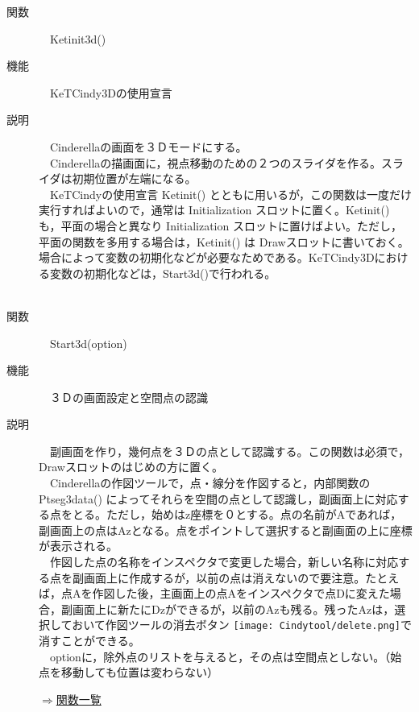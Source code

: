 \documentclass[papersize,a4paper,12pt,uplatex]{jsarticle}
\begin{document}
\begin{description}

\hypertarget{ketinit3d}{}
\item[関数]　Ketinit3d()
\item[機能]　KeTCindy3Dの使用宣言
\item[説明]　Cinderellaの画面を３Ｄモードにする。\\
　Cinderellaの描画面に，視点移動のための２つのスライダを作る。スライダは初期位置が左端になる。\\
　KeTCindyの使用宣言 Ketinit() とともに用いるが，この関数は一度だけ実行すればよいので，通常は Initialization スロットに置く。Ketinit() も，平面の場合と異なり Initialization スロットに置けばよい。ただし，平面の関数を多用する場合は，Ketinit() は Drawスロットに書いておく。場合によって変数の初期化などが必要なためである。KeTCindy3Dにおける変数の初期化などは，Start3d()で行われる。\\
　\\

\hypertarget{start3d}{}
\item[関数]　Start3d(option)
\item[機能]　３Ｄの画面設定と空間点の認識
\item[説明]　副画面を作り，幾何点を３Ｄの点として認識する。この関数は必須で，Drawスロットのはじめの方に置く。\\
　Cinderellaの作図ツールで，点・線分を作図すると，内部関数の Ptseg3data() によってそれらを空間の点として認識し，副画面上に対応する点をとる。ただし，始めはz座標を０とする。点の名前がAであれば，副画面上の点はAzとなる。点をポイントして選択すると副画面の上に座標が表示される。\\
　作図した点の名称をインスペクタで変更した場合，新しい名称に対応する点を副画面上に作成するが，以前の点は消えないので要注意。たとえば，点Aを作図した後，主画面上の点Aをインスペクタで点Dに変えた場合，副画面上に新たにDzができるが，以前のAzも残る。残ったAzは，選択しておいて作図ツールの消去ボタン \texttt{[image: Cindytool/delete.png]}で消すことができる。\\
　optionに，除外点のリストを与えると，その点は空間点としない。（始点を移動しても位置は変わらない）\\
\begin{flushright} \hyperlink{functionlist3d}{$\Rightarrow$関数一覧}\end{flushright}

\end{description}
\newpage
\end{document}
